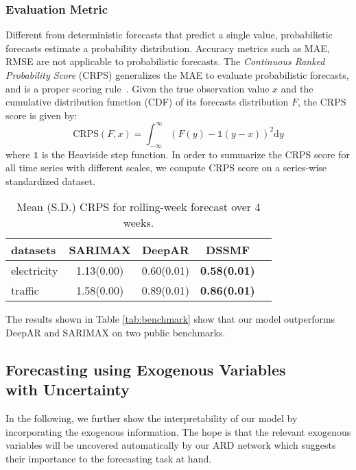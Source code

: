 \documentclass{article}
\begin{document}
\subsubsection{Evaluation Metric} Different from deterministic forecasts that predict a single value, probabilistic forecasts estimate a probability distribution. Accuracy metrics such as MAE, RMSE are not applicable to probabilistic forecasts. The \textit{Continuous Ranked Probability Score} (CRPS) generalizes the MAE to evaluate probabilistic forecasts, and is a proper scoring rule~\cite{gneiting2014probabilistic}. Given the true observation value $x$ and the cumulative distribution function (CDF) of its forecasts distribution $F$, the CRPS score is given by:
\begin{equation}
    \text{CRPS}(F, x) = \int_{-\infty}^{\infty}(F(y)-\mathds{1}(y-x))^2\mathrm{d}y
\end{equation}
where $\mathds{1}$ is the Heaviside step function. In order to summarize the CRPS score for all time series with different scales, we compute CRPS score on a series-wise standardized dataset.
\begin{table}[tb!]
	\begin{center}
		\begin{tabular}{l|cccc}
			\toprule
		datasets	& SARIMAX & DeepAR& DSSMF\\
			\hline
			{electricity} & 1.13(0.00) & 0.60(0.01) & \textbf{0.58(0.01)}\\
			{traffic} & 1.58(0.00) & 0.89(0.01) & \textbf{0.86(0.01)}\\
			\hline
		\end{tabular}
	\end{center}
\caption{Mean (S.D.) CRPS for rolling-week forecast over 4 weeks. }
\end{table}\label{tab:benchmark}

The results shown in Table \ref{tab:benchmark} show that our model outperforms DeepAR and SARIMAX on two public benchmarks. 

\subsection{Forecasting using Exogenous Variables\\
with Uncertainty}
In the following, we further show the interpretability of our model by incorporating the exogenous information. The hope is that the relevant exogenous variables will be uncovered automatically by our ARD network which suggests their importance to the forecasting task at hand.
\end{document}
